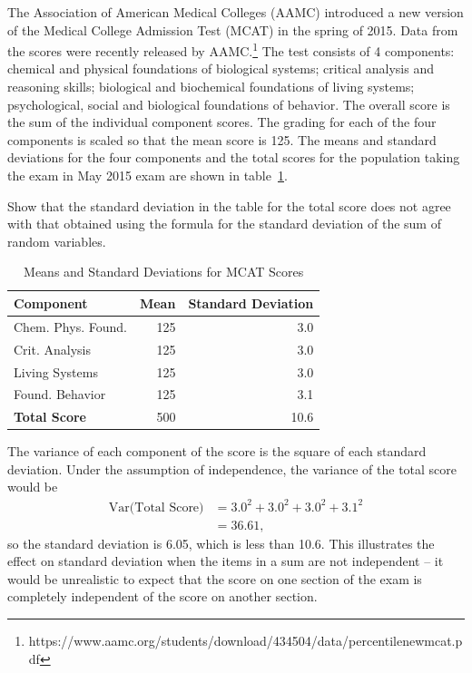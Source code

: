 \begin{example} {The Association of American Medical Colleges (AAMC) introduced a new version of the Medical College Admission Test (MCAT) in the spring of 2015. Data from the scores were recently released by AAMC.\footnote{https://www.aamc.org/students/download/434504/data/percentilenewmcat.pdf}  The test consists of 4 components: chemical and physical foundations of biological systems; critical analysis and reasoning skills; biological and biochemical foundations of living systems; psychological, social and biological foundations of behavior. The overall score is the sum of the individual component scores. The grading for each of the four components is scaled so that the mean score is 125.  The means and standard deviations for the four components and the total scores for the population taking the exam in May 2015 exam are shown in table~\ref{table:mcatScoreDistribution}.
	
Show that the standard deviation in the table for the total score does not agree with that obtained using the formula for the standard deviation of the sum of random variables. 

	\begin{table}[h]
		\centering
		\begin{tabular}{lrr}
			\hline
			\textbf{Component} & \textbf{Mean} & \textbf{Standard Deviation}\\
			\hline
			             Chem. Phys. Found. &   125 &   3.0\\
			             Crit. Analysis &   125 &    3.0 \\
			             Living  Systems &  125 &     3.0\\
			             Found. Behavior&   125 &     3.1\\
			             \textbf{Total Score} &    500 &     10.6\\
			\hline
		\end{tabular}
		\caption{Means and Standard Deviations for MCAT Scores}
		\label{table:mcatScoreDistribution}
	\end{table}	
}
The variance of each component of the score is the square of each standard deviation.  Under the assumption of independence, the variance of the total score would be 
\begin{align*}
	\textrm{Var(Total Score)} &= 3.0^2 + 3.0^2 + 3.0^2 + 3.1^2 \\
	    &= 36.61,
\end{align*}
so the standard deviation is 6.05, which is less than 10.6. This illustrates the effect on standard deviation when the items in a sum are not independent -- it would be unrealistic to expect that the score on one section of the exam is completely independent of the score on another section.
\end{example}



